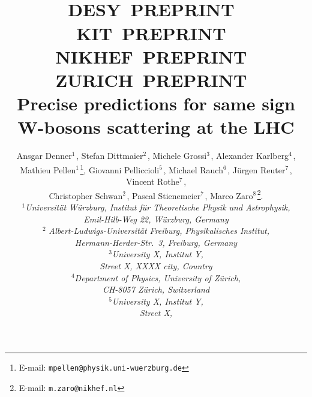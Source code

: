\documentclass[11pt,epsf]{article}
\begin{document}
\title{\hfill ~\\[-30mm]
\phantom{h} \hfill\mbox{\small DESY PREPRINT } \\
\vspace{-10mm}
\phantom{h} \hfill\mbox{\small KIT PREPRINT } \\
\vspace{-10mm}
\phantom{h} \hfill\mbox{\small NIKHEF PREPRINT } \\
\vspace{-10mm}
\phantom{h} \hfill\mbox{\small ZURICH PREPRINT }
\\[1cm]
\textbf{Precise predictions for same sign W-bosons scattering at the LHC}}

\date{}
\author{
Ansgar Denner$^{1\,}$,
Stefan Dittmaier$^{2\,}$,
Michele Grossi$^{3\,}$,
Alexander Karlberg$^{4\,}$, \\
Mathieu Pellen$^{1\,}$\footnote{E-mail:
  \texttt{mpellen@physik.uni-wuerzburg.de}},
Giovanni  Pelliccioli$^{5\,}$,
Michael Rauch$^{6\,}$,
J\"urgen Reuter$^{7\,}$,
Vincent Rothe$^{7\,}$, \\
Christopher Schwan$^{2\,}$,
Pascal Stienemeier$^{7\,}$,
Marco Zaro$^{8\,}$\footnote{E-mail:
  \texttt{m.zaro@nikhef.nl}}.
\\[9mm]
{\small\it
$^1$Universit\"at W\"urzburg, %
        Institut f\"ur Theoretische Physik und Astrophysik,} \\ %
{\small\it Emil-Hilb-Weg 22,  W\"urzburg, %
        Germany}\\[3mm]
$^2${\small\it
Albert-Ludwigs-Universit\"at Freiburg, Physikalisches Institut,} \\ %
{\small\it Hermann-Herder-Str.\ 3,  Freiburg, Germany}\\[3mm]
{\small\it
$^3$University X, %
        Institut Y,} \\ %
{\small\it Street X, \linebreak %
        XXXX city, %
        Country}\\[3mm]
{\small\it
$^4$Department of Physics, University of Z\"urich,} \\ %
{\small\it CH-8057
Z\"urich, Switzerland}\\[3mm]
{\small\it
$^5$University X, %
        Institut Y,} \\ %
{\small\it Street X, \linebreak %
}}
\end{document}
